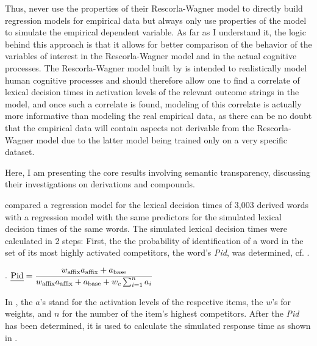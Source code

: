 Thus,
  \citet{Baayenetal:2011} never use the properties of their
  Rescorla-Wagner model to directly build regression models for
  empirical data but always only use properties of the model to
  simulate the empirical dependent variable. As far as I
  understand it, the logic behind this approach is that it allows for
  better comparison of the behavior of the variables of interest in
  the Rescorla-Wagner model and in the actual cognitive processes. The
  Rescorla-Wagner model built by \citet{Baayenetal:2011} is intended
  to realistically model human cognitive processes and should
  therefore allow one to find a correlate of lexical decision times in
  activation levels of the relevant outcome strings in the model, and
  once such a correlate is found, modeling of this correlate is
  actually more informative than modeling the real empirical data, as
  there can be no doubt that the empirical data will contain aspects
  not derivable from the Rescorla-Wagner model due to the latter model
  being trained only on a very specific dataset. 



Here, I am presenting the core results involving semantic transparency, discussing their investigations on derivations and compounds.

\citet{Baayenetal:2011} compared a regression model for the lexical
decision times of 3,003 derived words with a regression model with the
same predictors for the simulated lexical decision times of the same
words. The simulated lexical decision times were calculated in
2 steps: First, the the probability of identification of a word in the
set of its most highly activated competitors, the word's \emph{Pid}, was
determined, cf. \Next.


\ex.    %
\( \displaystyle \text{\emph{Pid}} = \frac{w_{\text{affix}} a_{\text{affix}} +
  a_{\text{base}}}{w_{\text{affix}}a_{\text{affix}}+a_{\text{base}}+w_c \sum_{i=1}^{n}a_i}  \)

In \Last, the $a$'s stand for the activation levels of
    the respective items, the $w$'s for weights, and $n$ for the
    number of the item's highest competitors. After the \emph{Pid} has
    been determined, it is used to calculate the simulated response
    time as shown in \Next.

